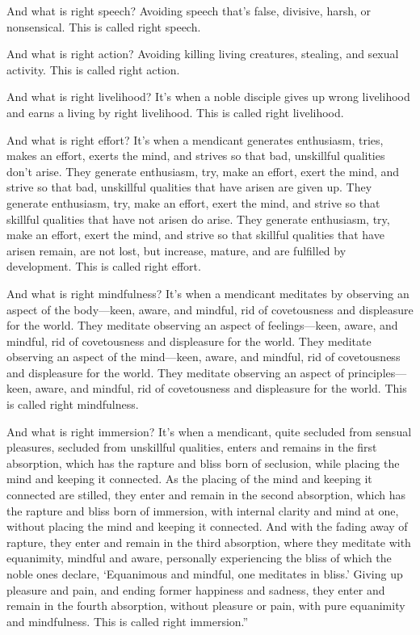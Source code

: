 \documentclass[12pt,openany]{book}%
\begin{document}
And what is right speech? Avoiding speech that’s false, divisive, harsh, or nonsensical. This is called right speech. 

And what is right action? Avoiding killing living creatures, stealing, and sexual activity. This is called right action. 

And what is right livelihood? It’s when a noble disciple gives up wrong livelihood and earns a living by right livelihood. This is called right livelihood. 

And what is right effort? It’s when a mendicant generates enthusiasm, tries, makes an effort, exerts the mind, and strives so that bad, unskillful qualities don’t arise. They generate enthusiasm, try, make an effort, exert the mind, and strive so that bad, unskillful qualities that have arisen are given up. They generate enthusiasm, try, make an effort, exert the mind, and strive so that skillful qualities that have not arisen do arise. They generate enthusiasm, try, make an effort, exert the mind, and strive so that skillful qualities that have arisen remain, are not lost, but increase, mature, and are fulfilled by development. This is called right effort. 

And what is right mindfulness? It’s when a mendicant meditates by observing an aspect of the body—keen, aware, and mindful, rid of covetousness and displeasure for the world. They meditate observing an aspect of feelings—keen, aware, and mindful, rid of covetousness and displeasure for the world. They meditate observing an aspect of the mind—keen, aware, and mindful, rid of covetousness and displeasure for the world. They meditate observing an aspect of principles—keen, aware, and mindful, rid of covetousness and displeasure for the world. This is called right mindfulness. 

And what is right immersion? It’s when a mendicant, quite secluded from sensual pleasures, secluded from unskillful qualities, enters and remains in the first absorption, which has the rapture and bliss born of seclusion, while placing the mind and keeping it connected. As the placing of the mind and keeping it connected are stilled, they enter and remain in the second absorption, which has the rapture and bliss born of immersion, with internal clarity and mind at one, without placing the mind and keeping it connected. And with the fading away of rapture, they enter and remain in the third absorption, where they meditate with equanimity, mindful and aware, personally experiencing the bliss of which the noble ones declare, ‘Equanimous and mindful, one meditates in bliss.’ Giving up pleasure and pain, and ending former happiness and sadness, they enter and remain in the fourth absorption, without pleasure or pain, with pure equanimity and mindfulness. This is called right immersion.” 
\end{document}
